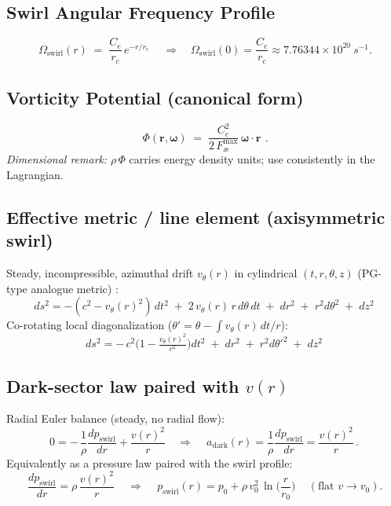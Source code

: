 \documentclass[11pt,a4paper]{article}
\newcommand{\aeether}{\text{\ae}} %
\begin{document}
    \subsection{Swirl Angular Frequency Profile}
    \[
        \boxed{\ \Omega_{\mathrm{swirl}}(r) \;=\; \frac{C_e}{r_c}\,e^{-r/r_c}\ }\quad\Rightarrow\quad \Omega_{\mathrm{swirl}}(0)=\frac{C_e}{r_c}\approx 7.76344\times 10^{20}\ \si{s^{-1}}.
    \]

    \subsection{Vorticity Potential (canonical form)}
    \[
        \boxed{\ \Phi(\bm r,\bm\omega) \;=\; \frac{C_e^{2}}{2\,F_{\aeether}^{\max}}\,\bm\omega\!\cdot\!\bm r\ }\,.
    \]
    \noindent\emph{Dimensional remark:} $\rho\,\Phi$ carries energy density units; use consistently in the Lagrangian.

    \subsection{Effective metric / line element (axisymmetric swirl)}
    Steady, incompressible, azimuthal drift $v_\theta(r)$ in cylindrical $(t,r,\theta,z)$ (PG-type analogue metric) \cite{Unruh1981,Visser1998,Painleve1921,Gullstrand1922}:
    \[
        \boxed{\, ds^2 = -(c^2 - v_\theta(r)^2)\,dt^2 \;+\; 2\,v_\theta(r)\,r\,d\theta\,dt \;+\; dr^2 \;+\; r^2 d\theta^2 \;+\; dz^2 \,}
    \]
    Co-rotating local diagonalization ($\theta' = \theta - \int v_\theta(r)\,dt/ r$):
    \[
        \boxed{\, ds^2 = -\,c^2\Big(1-\tfrac{v_\theta(r)^2}{c^2}\Big)dt^2 \;+\; dr^2 \;+\; r^2 d\theta'^2 \;+\; dz^2 \,}
    \]

    \subsection{Dark-sector law paired with $v(r)$}
    Radial Euler balance (steady, no radial flow):
    \[
        0 = -\,\frac{1}{\rho}\frac{dp_{\mathrm{swirl}}}{dr} + \frac{v(r)^2}{r}
        \quad\Rightarrow\quad
        \boxed{\, a_{\mathrm{dark}}(r) = \frac{1}{\rho}\frac{dp_{\mathrm{swirl}}}{dr} = \frac{v(r)^2}{r} \,}.
    \]
    Equivalently as a pressure law paired with the swirl profile:
    \[
        \boxed{\, \frac{dp_{\mathrm{swirl}}}{dr} = \rho\,\frac{v(r)^2}{r} \,}
        \quad\Rightarrow\quad
        \boxed{\, p_{\mathrm{swirl}}(r) = p_0 + \rho\,v_0^2\,\ln\!\Big(\frac{r}{r_0}\Big) \,}\quad (\text{flat } v\to v_0).
    \]
\end{document}
